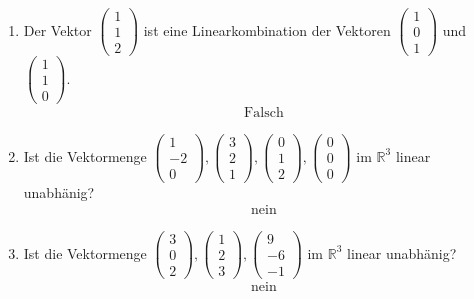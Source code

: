 \documentclass[12pt]{article}
\begin{document}
\begin{enumerate}[start=1,label={\bfseries Frage \arabic*:},leftmargin=1in]
    \item Der Vektor $\begin{pmatrix} 1 \\ 1 \\ 2 \end{pmatrix}$ ist eine Linearkombination der Vektoren
          $\begin{pmatrix} 1 \\ 0 \\ 1 \end{pmatrix}$ und $\begin{pmatrix} 1 \\ 1 \\ 0 \end{pmatrix}$.
    \begin{align*}
        \text{Falsch}
    \end{align*}

    \item Ist die Vektormenge 
          ${\begin{pmatrix} 1 \\ -2 \\ 0 \end{pmatrix} , \begin{pmatrix} 3 \\ 2 \\ 1 \end{pmatrix} , 
          \begin{pmatrix} 0 \\ 1 \\ 2 \end{pmatrix} , \begin{pmatrix} 0 \\ 0 \\ 0 \end{pmatrix}}$
          im $\mathbb{R}^3$ linear unabhänig?
    \begin{align*}
        \text{nein}
    \end{align*}

    \item Ist die Vektormenge 
          $\begin{pmatrix} 3 \\ 0 \\ 2 \end{pmatrix} , \begin{pmatrix} 1 \\ 2 \\ 3 \end{pmatrix} , 
          \begin{pmatrix} 9 \\ -6 \\ -1 \end{pmatrix}$ im $\mathbb{R}^3$ linear unabhänig?
    \begin{align*}
        \text{nein}
    \end{align*}

\end{enumerate}
\end{document}
